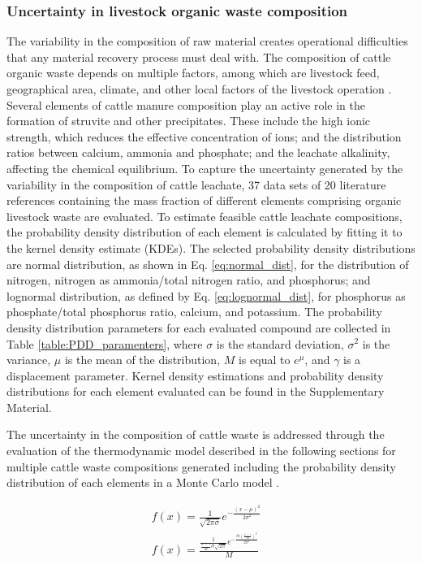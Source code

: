 \documentclass[10pt,a4paper]{article}
\begin{document}
\subsubsection{Uncertainty in livestock organic waste composition} \label{comp_dist}
The variability in the composition of raw material creates operational difficulties that any material recovery process must deal with. The composition of cattle organic waste depends on multiple factors, among which are livestock feed, geographical area, climate, and other local factors of the livestock operation . Several elements of cattle manure composition play an active role in the formation of struvite and other precipitates. These include the high ionic strength, which reduces the effective concentration of ions; and the distribution ratios between calcium, ammonia and phosphate; and the leachate alkalinity, affecting the chemical equilibrium. To capture the uncertainty generated by the variability in the composition of cattle leachate, 37 data sets of 20 literature references containing the mass fraction of different elements comprising organic livestock waste are evaluated. To estimate feasible cattle leachate compositions, the probability density distribution of each element is calculated by fitting it to the kernel density estimate (KDEs). The selected probability density distributions are normal distribution, as shown in Eq. \ref{eq:normal_dist}, for the distribution of nitrogen, nitrogen as ammonia/total nitrogen ratio, and phosphorus; and lognormal distribution, as defined by  Eq. \ref{eq:lognormal_dist}, for phosphorus as phosphate/total phosphorus ratio, calcium, and potassium. The probability density distribution parameters for each evaluated compound are collected in Table \ref{table:PDD_paramenters}, where $\sigma$ is the standard deviation, $\sigma^2$ is the variance, $\mu$ is the mean of the distribution, $M$ is equal to $e^{\mu}$, and $\gamma$ is a displacement parameter. Kernel density estimations and probability density distributions for each element evaluated can be found in the Supplementary Material. 

The uncertainty in the composition of cattle waste is addressed through the evaluation of the thermodynamic model described in the following sections for multiple cattle waste compositions generated including the probability density distribution of each elements in a Monte Carlo model .

\begin{align}
f(x) = \frac{1}{\sqrt{2 \pi \sigma}}e^{- \frac{\left( x - \mu \right)^{2}}{2 \sigma ^ {2}}} & \label{eq:normal_dist} \\
f(x) = \frac{\frac{1}{\frac{x- \gamma}{M} \sigma \sqrt{2 \pi}} e^{-\frac{ln\left( \frac{x- \gamma}{M} \right)^{2}}{2 \sigma^{2}}}}{M} \label{eq:lognormal_dist}
\end{align}
\end{document}
